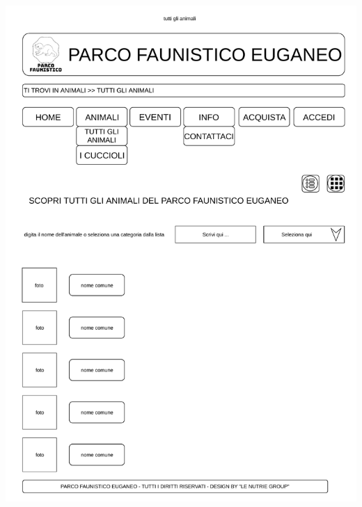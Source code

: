 \begin{center}
\begin{minipage}{0.4\linewidth}
            \includegraphics[width=\linewidth]{./../docs/Analisi/bozze/animali-list.pdf}
        \end{minipage}%
        \hfill
        \begin{minipage}{0.4\linewidth}

\end{minipage}
\end{center}
